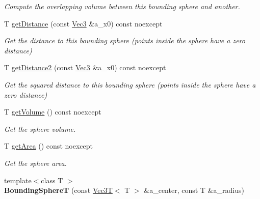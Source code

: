 \begin{DoxyCompactItemize}
\begin{DoxyCompactList}\small\item\em Compute the overlapping volume between this bounding sphere and another. \end{DoxyCompactList}\item 
T \hyperlink{classEBGeometry_1_1BoundingVolumes_1_1BoundingSphereT_a737a3af41ac98a78685092ab6aa967b5}{get\+Distance} (const \hyperlink{classEBGeometry_1_1BoundingVolumes_1_1BoundingSphereT_a65cef119542a4c7c1cabb1ea36f40336}{Vec3} \&a\+\_\+x0) const noexcept
\begin{DoxyCompactList}\small\item\em Get the distance to this bounding sphere (points inside the sphere have a zero distance) \end{DoxyCompactList}\item 
T \hyperlink{classEBGeometry_1_1BoundingVolumes_1_1BoundingSphereT_af34b67dfb55ff102bda80b76a90e28d6}{get\+Distance2} (const \hyperlink{classEBGeometry_1_1BoundingVolumes_1_1BoundingSphereT_a65cef119542a4c7c1cabb1ea36f40336}{Vec3} \&a\+\_\+x0) const noexcept
\begin{DoxyCompactList}\small\item\em Get the squared distance to this bounding sphere (points inside the sphere have a zero distance) \end{DoxyCompactList}\item 
T \hyperlink{classEBGeometry_1_1BoundingVolumes_1_1BoundingSphereT_a9289fa08e9cf3d0f6e7e0fb5556233f5}{get\+Volume} () const noexcept
\begin{DoxyCompactList}\small\item\em Get the sphere volume. \end{DoxyCompactList}\item 
T \hyperlink{classEBGeometry_1_1BoundingVolumes_1_1BoundingSphereT_afee6f3298c1729e45f34d737efaabe19}{get\+Area} () const noexcept
\begin{DoxyCompactList}\small\item\em Get the sphere area. \end{DoxyCompactList}\item 
\mbox{\label{classEBGeometry_1_1BoundingVolumes_1_1BoundingSphereT_aa51cf92c01415a84a9906d7973bfcc43}} 
{\footnotesize template$<$class T $>$ }\\{\bfseries Bounding\+SphereT} (const \hyperlink{classVec3T}{Vec3T}$<$ T $>$ \&a\+\_\+center, const T \&a\+\_\+radius)

\end{DoxyCompactItemize}
